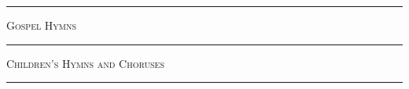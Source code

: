 \documentclass{book}
\begin{document}
\begin{multicols}{2}
{\small
\setlength\baselineskip{10pt minus 1pt}

}
\end{multicols}
\noindent\hfil\rule{0.5\textwidth}{.4pt}\hfil\vfill\bigbreak

{\hfill\large\textsc{Gospel Hymns}\hfill}
\begin{multicols}{2}
{\small
\setlength\baselineskip{10pt minus 1pt}

}
\end{multicols}
\noindent\hfil\rule{0.5\textwidth}{.4pt}\hfil\vfill\bigbreak

\begin{minipage}{\textwidth} %
{\hfill\large\textsc{Children’s Hymns and Choruses}\hfill}
\begin{multicols}{2}
{\small
\setlength\baselineskip{10pt minus 1pt}

}
\end{multicols}
\noindent\hfil\rule{0.5\textwidth}{.4pt}\hfil
\end{minipage}
\end{document}
